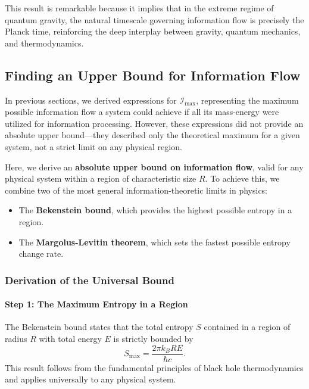 \documentclass[12pt]{article}
\begin{document}
This result is remarkable because it implies that in the extreme regime of quantum gravity, the natural timescale governing information flow is precisely the Planck time, reinforcing the deep interplay between gravity, quantum mechanics, and thermodynamics.


\subsection{Finding an Upper Bound for Information Flow}

In previous sections, we derived expressions for \( \mathcal{I}_{\max} \), representing the maximum possible information flow a system could achieve if all its mass-energy were utilized for information processing. However, these expressions did not provide an absolute upper bound—they described only the theoretical maximum for a given system, not a strict limit on any physical region.

Here, we derive an \textbf{absolute upper bound on information flow}, valid for any physical system within a region of characteristic size \( R \). To achieve this, we combine two of the most general information-theoretic limits in physics:
\begin{itemize}
    \item The \textbf{Bekenstein bound}, which provides the highest possible entropy in a region.
    \item The \textbf{Margolus-Levitin theorem}, which sets the fastest possible entropy change rate.
\end{itemize}

\subsubsection{Derivation of the Universal Bound}

\paragraph{Step 1: The Maximum Entropy in a Region}

The Bekenstein bound states that the total entropy \( S \) contained in a region of radius \( R \) with total energy \( E \) is strictly bounded by
\begin{equation}
    S_{\max} = \frac{2\pi k_B R E}{\hbar c}.
\end{equation}
This result follows from the fundamental principles of black hole thermodynamics and applies universally to any physical system.
\end{document}
